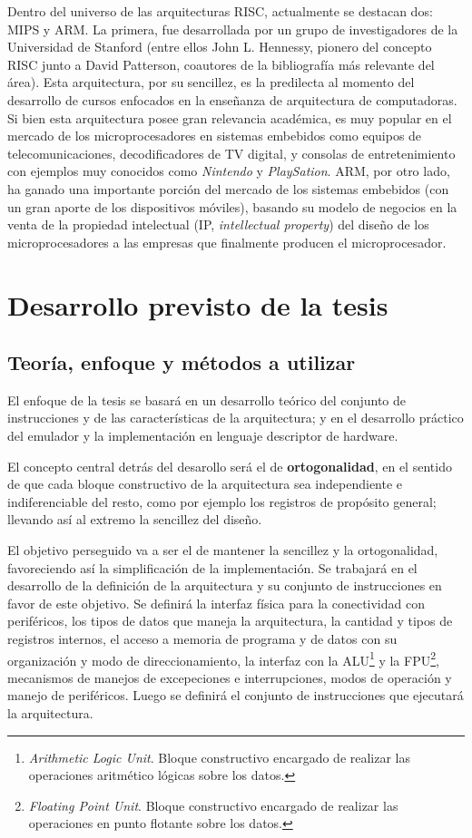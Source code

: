\documentclass[a4paper]{article}
\begin{document}
Dentro del universo de las arquitecturas RISC, actualmente se destacan dos: MIPS y ARM. La primera, fue desarrollada por un grupo de investigadores de la Universidad de Stanford (entre ellos John L. Hennessy, pionero del concepto RISC junto a David Patterson, coautores de la bibliografía más relevante del área). Esta arquitectura, por su sencillez, es la predilecta al momento del desarrollo de cursos enfocados en la enseñanza de arquitectura de computadoras. Si bien esta arquitectura posee gran relevancia académica, es muy popular en el mercado de los microprocesadores en sistemas embebidos como equipos de telecomunicaciones, decodificadores de TV digital, y consolas de entretenimiento con ejemplos muy conocidos como \emph{Nintendo} y \emph{PlaySation}. ARM, por otro lado, ha ganado una importante porción del mercado de los sistemas embebidos (con un gran aporte de los dispositivos móviles), basando su modelo de negocios en la venta de la propiedad intelectual (IP, \emph{intellectual property}) del diseño de los microprocesadores a las empresas que finalmente producen el microprocesador.

\section{Desarrollo previsto de la tesis}

\subsection{Teoría, enfoque y métodos a utilizar}

El enfoque de la tesis se basará en un desarrollo teórico del conjunto de instrucciones y de las características de la arquitectura; y en el desarrollo
práctico del emulador y la implementación en lenguaje descriptor de hardware.

El concepto central detrás del desarollo será el de \textbf{ortogonalidad}, en el sentido de que cada bloque constructivo de la arquitectura sea independiente e indiferenciable del resto, como por ejemplo los registros de propósito general; llevando así al extremo la sencillez del diseño.

El objetivo perseguido va a ser el de mantener la sencillez y la ortogonalidad, favoreciendo así la simplificación de la implementación. Se trabajará en el desarrollo de la definición de la arquitectura y su conjunto de instrucciones en favor de este objetivo. Se definirá la interfaz física para la conectividad con periféricos, los tipos de datos que maneja la arquitectura, la cantidad y tipos de registros internos, el acceso a memoria de programa y de datos con su organización y modo de direccionamiento, la interfaz con la ALU\footnote{\label{ALU} \emph{Arithmetic Logic Unit}. Bloque constructivo encargado de realizar las operaciones aritmético lógicas sobre los datos.} y la FPU\footnote{\label{FPU} \emph{Floating Point Unit}. Bloque constructivo encargado de realizar las operaciones en punto flotante sobre los datos.}, mecanismos de manejos de excepeciones e interrupciones, modos de operación y manejo de periféricos. Luego se definirá el conjunto de instrucciones que ejecutará la arquitectura.
\end{document}
